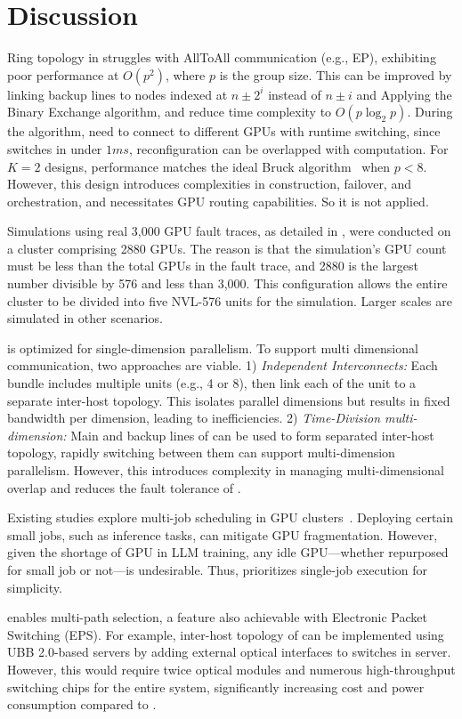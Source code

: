 
\section{Discussion}

Ring topology in \sys struggles with AllToAll communication (e.g., EP), exhibiting poor performance at $O(p^2)$, where $p$ is the group size. This can be improved by linking backup lines to nodes indexed at $n\pm 2^i$ instead of $n\pm i$ and Applying the Binary Exchange algorithm, and reduce time complexity to $O(p\log_2 p)$. During the algorithm, \ocstrx{} need to connect to different GPUs with runtime switching, since \ocstrx{} switches in under $1ms$, reconfiguration can be overlapped with computation. For $K=2$ \sys designs, performance matches the ideal Bruck algorithm~\cite{bruck} when $p<8$. However, this design introduces complexities in construction, failover, and orchestration, and necessitates GPU routing capabilities. So it is not applied.

 Simulations using real 3,000 GPU fault traces, as detailed in , were conducted on a cluster comprising 2880 GPUs. The reason is that the simulation's GPU count must be less than the total GPUs in the fault trace, and 2880 is the largest number divisible by 576 and less than 3,000. This configuration allows the entire cluster to be divided into five NVL-576 units for the simulation.  Larger scales are simulated in other scenarios.

\sys is optimized for single-dimension parallelism. To support multi dimensional communication, two approaches are viable. 1) \textit{Independent Interconnects: } Each \ocstrx{} bundle includes multiple \ocstrx{} units (e.g., 4 or 8), then link each of the unit to a separate inter-host topology. This isolates parallel dimensions but results in fixed bandwidth per dimension, leading to inefficiencies. 2) \textit{Time-Division multi-dimension: } Main and backup lines of \ocstrx{} can be used to form separated inter-host topology, rapidly switching between them can support multi-dimension parallelism. However, this introduces complexity in managing multi-dimensional overlap and reduces the fault tolerance of \sys.  


 Existing studies explore multi-job scheduling in GPU clusters~\cite{mlass,lyra}. Deploying certain small jobs, such as inference tasks, can mitigate GPU fragmentation. However, given the shortage of GPU in LLM training, any idle GPU—whether repurposed for small job or not—is undesirable. Thus, \sys prioritizes single-job execution for simplicity. 

 \ocstrx{} enables multi-path selection, a feature also achievable with Electronic Packet Switching (EPS). For example, inter-host topology of \sys can be implemented using UBB 2.0-based servers by adding external optical interfaces to switches in server. However, this would require twice optical modules and numerous high-throughput switching chips for the entire system, significantly increasing cost and power consumption compared to \ocstrx{}.

